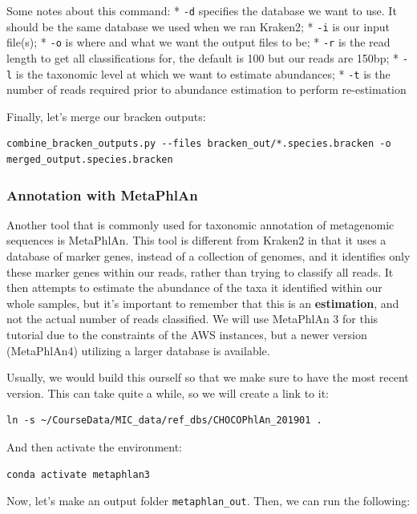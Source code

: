 \documentclass[
]{book}
\begin{document}
Some notes about this command:
* \texttt{-d} specifies the database we want to use. It should be the same database we used when we ran Kraken2;
* \texttt{-i} is our input file(s);
* \texttt{-o} is where and what we want the output files to be;
* \texttt{-r} is the read length to get all classifications for, the default is 100 but our reads are 150bp;
* \texttt{-l} is the taxonomic level at which we want to estimate abundances;
* \texttt{-t} is the number of reads required prior to abundance estimation to perform re-estimation

Finally, let's merge our bracken outputs:

\begin{verbatim}
combine_bracken_outputs.py --files bracken_out/*.species.bracken -o merged_output.species.bracken
\end{verbatim}

\subsubsection{Annotation with MetaPhlAn}\label{annotation-with-metaphlan}

Another tool that is commonly used for taxonomic annotation of metagenomic sequences is MetaPhlAn. This tool is different from Kraken2 in that it uses a database of marker genes, instead of a collection of genomes, and it identifies only these marker genes within our reads, rather than trying to classify all reads. It then attempts to estimate the abundance of the taxa it identified within our whole samples, but it's important to remember that this is an \textbf{estimation}, and not the actual number of reads classified. We will use MetaPhlAn 3 for this tutorial due to the constraints of the AWS instances, but a newer version (MetaPhlAn4) utilizing a larger database is available.

Usually, we would build this ourself so that we make sure to have the most recent version. This can take quite a while, so we will create a link to it:

\begin{verbatim}
ln -s ~/CourseData/MIC_data/ref_dbs/CHOCOPhlAn_201901 .
\end{verbatim}

And then activate the environment:

\begin{verbatim}
conda activate metaphlan3
\end{verbatim}

Now, let's make an output folder \texttt{metaphlan\_out}. Then, we can run the following:
\end{document}
